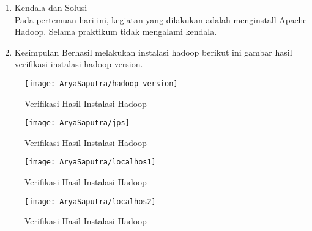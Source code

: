 
\begin{enumerate}
\item Kendala dan Solusi \\
Pada pertemuan hari ini, kegiatan yang dilakukan adalah menginstall Apache Hadoop. Selama praktikum tidak mengalami kendala.

\item Kesimpulan
Berhasil melakukan instalasi hadoop berikut ini gambar hasil verifikasi instalasi hadoop version.
\end{enumerate}

\begin{figure}[!ht]
\texttt{[image: AryaSaputra/hadoop version]}
\caption{Verifikasi Hasil Instalasi Hadoop}
\label{gam:Hadoop-version}
\end{figure}

\begin{figure}[!ht]
\texttt{[image: AryaSaputra/jps]}
\caption{Verifikasi Hasil Instalasi Hadoop}
\label{gam:instalasi-hadoop}
\end{figure}

\begin{figure}[!ht]
\texttt{[image: AryaSaputra/localhos1]}
\caption{Verifikasi Hasil Instalasi Hadoop}
\label{gam:instalasi-hadoop}
\end{figure}

\begin{figure}[!ht]
\texttt{[image: AryaSaputra/localhos2]}
\caption{Verifikasi Hasil Instalasi Hadoop}
\label{gam:instalasi-hadoop}
\end{figure}

